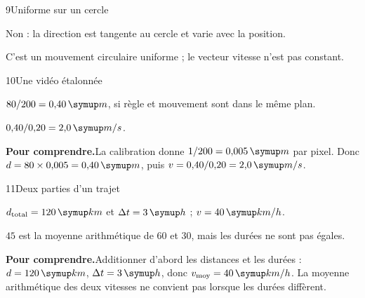 \par\noindent\begin{minipage}{\linewidth}
\begin{corrige}{9}{Uniforme sur un cercle}
\begin{questions}
\item Non : la direction est tangente au cercle et varie avec la position.
\item C’est un mouvement circulaire uniforme ; le vecteur vitesse n’est pas constant.
\end{questions}
\end{corrige}
\end{minipage}
\par\noindent\begin{minipage}{\linewidth}
\begin{corrige}{10}{Une vidéo étalonnée}
\begin{questions}
\item $80/200=0{,}40\unite m$, si règle et mouvement sont dans le même plan.
\item $0{,}40/0{,}20=2{,}0\unite{m/s}$.
\end{questions}
\par\smallskip\noindent\textbf{Pour comprendre.}\enspace La calibration donne $1/200=0{,}005\unite m$ par pixel. Donc $d=80\times0{,}005=0{,}40\unite m$, puis $v=0{,}40/0{,}20=2{,}0\unite{m/s}$.\par
{}
\end{corrige}
\end{minipage}
\par\noindent\begin{minipage}{\linewidth}
\begin{corrige}{11}{Deux parties d’un trajet}
\begin{questions}
\item $d_{\rm total}=120\unite{km}$ et $\Delta t=3\unite h$ ; $v=40\unite{km/h}$.
\item $45$ est la moyenne arithmétique de 60 et 30, mais les durées ne sont pas égales.
\end{questions}
\par\smallskip\noindent\textbf{Pour comprendre.}\enspace Additionner d’abord les distances et les durées : $d=120\unite{km}$, $\Delta t=3\unite h$, donc $v_{\rm moy}=40\unite{km/h}$. La moyenne arithmétique des deux vitesses ne convient pas lorsque les durées diffèrent.\par
\end{corrige}
\end{minipage}
